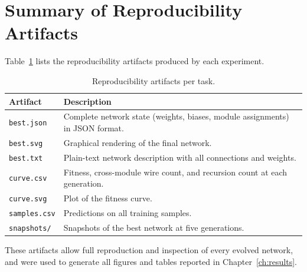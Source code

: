 \section{Summary of Reproducibility Artifacts}
\label{sec:artifacts}

Table~\ref{tab:artifacts} lists the reproducibility artifacts produced
by each experiment.

\begin{table}[h]
  \centering
  \small
  \caption{Reproducibility artifacts per task.}
  \label{tab:artifacts}
  \begin{tabular}{lp{9cm}}
    \toprule
    \textbf{Artifact} & \textbf{Description} \\
    \midrule
    \texttt{best.json} & Complete network state (weights, biases,
      module assignments) in JSON format. \\
    \texttt{best.svg} & Graphical rendering of the final network. \\
    \texttt{best.txt} & Plain-text network description with all
      connections and weights. \\
    \texttt{curve.csv} & Fitness, cross-module wire count, and
      recursion count at each generation. \\
    \texttt{curve.svg} & Plot of the fitness curve. \\
    \texttt{samples.csv} & Predictions on all training samples. \\
    \texttt{snapshots/} & Snapshots of the best network at five
      generations. \\
    \bottomrule
  \end{tabular}
\end{table}

These artifacts allow full reproduction and inspection of every
evolved network, and were used to generate all figures and tables
reported in Chapter~\ref{ch:results}.